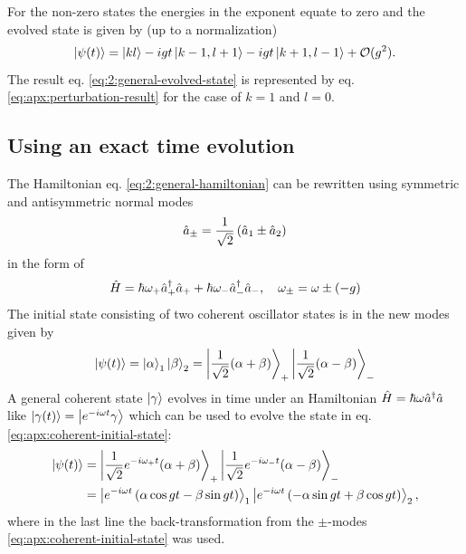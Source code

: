 For the non-zero states the energies in the exponent equate to zero and the evolved state is given by (up to a normalization)
\begin{equation}\label{eq:apx:perturbation-result}
  \ket{\psi(t)} = \ket{kl} - i g t \ket{k-1,l+1} - i g t \ket{k+1,l-1} + \mathcal{O}(g^2).
\end{equation}
The result eq. \eqref{eq:2:general-evolved-state} is represented by eq. \eqref{eq:apx:perturbation-result} for the case of $k=1$ and $l=0$.

\subsection{Using an exact time evolution}
\label{apx:general-coherent-state-evolution}
The Hamiltonian eq. \eqref{eq:2:general-hamiltonian} can be rewritten using symmetric and antisymmetric normal modes
\begin{equation}
  \hat{a}_\pm = \frac{1}{\sqrt{2}} \left( \hat{a}_1 \pm \hat{a}_2 \right)
\end{equation}
in the form of 
\begin{equation}
  \hat{H} = \hbar \omega_+ \hat{a}^\dagger_+\hat{a}_+ + \hbar \omega_- \hat{a}^\dagger_-\hat{a}_- ,  \quad  \omega_\pm = \omega \pm (-g)
\end{equation}
The initial state consisting of two coherent oscillator states is in the new modes given by
\begin{equation}\label{eq:apx:coherent-initial-state}
  \ket{\psi(t)} = \ket{\alpha}_1\ket{\beta}_2 = \ket{\frac{1}{\sqrt{2}} (\alpha + \beta)}_+\ket{\frac{1}{\sqrt{2}} (\alpha - \beta)}_-
\end{equation}
A general coherent state $\ket{\gamma}$ evolves in time under an Hamiltonian $\hat{H} = \hbar \omega \hat{a}^\dagger \hat{a}$ like $\ket{\gamma(t)} = \ket{e^{-i\omega t} \gamma}$ which can be used to evolve the state in eq. \eqref{eq:apx:coherent-initial-state}:
\begin{align}
  \ket{\psi(t)} 
  &= \ket{ \frac{1}{\sqrt{2}} e^{-i\omega_+t} (\alpha + \beta) }_+\ket{ \frac{1}{\sqrt{2}} e^{-i\omega_-t} (\alpha - \beta) }_- \\
  &= \ket{ e^{-i\omega t} \left( \alpha \cos gt - \beta \sin gt \right) }_1 \ket{ e^{-i\omega t} \left( - \alpha \sin gt + \beta \cos gt \right) }_2, 
\end{align}
where in the last line the back-transformation from the $\pm$-modes \eqref{eq:apx:coherent-initial-state} was used.




